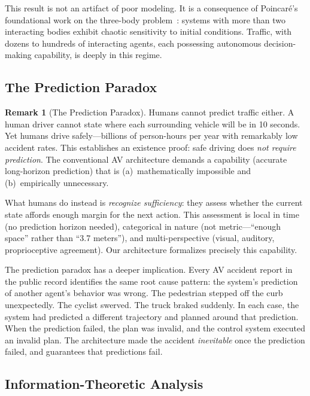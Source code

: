 \documentclass[twocolumn,10pt]{article}
\theoremstyle{definition}
\newtheorem{remark}[theorem]{Remark}
\begin{document}
This result is not an artifact of poor modeling. It is a consequence of Poincar\'{e}'s foundational work on the three-body problem~\cite{poincare1890}: systems with more than two interacting bodies exhibit chaotic sensitivity to initial conditions. Traffic, with dozens to hundreds of interacting agents, each possessing autonomous decision-making capability, is deeply in this regime.

\subsection{The Prediction Paradox}

\begin{remark}[The Prediction Paradox]
\label{rem:prediction-paradox}
Humans cannot predict traffic either. A human driver cannot state where each surrounding vehicle will be in 10 seconds. Yet humans drive safely---billions of person-hours per year with remarkably low accident rates. This establishes an existence proof: safe driving does \emph{not require prediction}. The conventional AV architecture demands a capability (accurate long-horizon prediction) that is (a)~mathematically impossible and (b)~empirically unnecessary.
\end{remark}

What humans do instead is \emph{recognize sufficiency}: they assess whether the current state affords enough margin for the next action. This assessment is local in time (no prediction horizon needed), categorical in nature (not metric---``enough space'' rather than ``3.7 meters''), and multi-perspective (visual, auditory, proprioceptive agreement). Our architecture formalizes precisely this capability.

The prediction paradox has a deeper implication. Every AV accident report in the public record identifies the same root cause pattern: the system's prediction of another agent's behavior was wrong. The pedestrian stepped off the curb unexpectedly. The cyclist swerved. The truck braked suddenly. In each case, the system had predicted a different trajectory and planned around that prediction. When the prediction failed, the plan was invalid, and the control system executed an invalid plan. The architecture made the accident \emph{inevitable} once the prediction failed, and  guarantees that predictions fail.

\subsection{Information-Theoretic Analysis}
\end{document}
